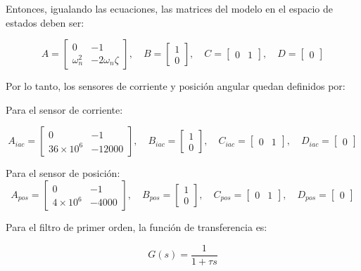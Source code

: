 \documentclass{article}
\begin{document}
Entonces, igualando las ecuaciones, las matrices del modelo en el espacio de estados deben ser:

\[
A = \begin{bmatrix}
0 & -1 \\
\omega_n^2 & -2\omega_n\zeta
\end{bmatrix}, \quad
B = \begin{bmatrix}
1 \\
0
\end{bmatrix}, \quad
C = \begin{bmatrix}
0 & 1
\end{bmatrix}, \quad
D = \begin{bmatrix}
0
\end{bmatrix}
\]

Por lo tanto, los sensores de corriente y posición angular quedan definidos por:

Para el sensor de corriente:

\[
A_{iac} = \begin{bmatrix}
0 & -1 \\
36 \times 10^6 & -12000
\end{bmatrix}, \quad
B_{iac} = \begin{bmatrix}
1 \\
0
\end{bmatrix}, \quad
C_{iac} = \begin{bmatrix}
0 & 1
\end{bmatrix}, \quad
D_{iac} = \begin{bmatrix}
0
\end{bmatrix}
\]

Para el sensor de posición:
\[
A_{pos} = \begin{bmatrix}
0 & -1 \\
4 \times 10^6 & -4000
\end{bmatrix}, \quad
B_{pos} = \begin{bmatrix}
1 \\
0
\end{bmatrix}, \quad
C_{pos} = \begin{bmatrix}
0 & 1
\end{bmatrix}, \quad
D_{pos} = \begin{bmatrix}
0
\end{bmatrix}
\]

Para el filtro de primer orden, la función de transferencia es:

\begin{equation}
G(s) = \frac{1}{1 + \tau s}
\end{equation}
\end{document}
